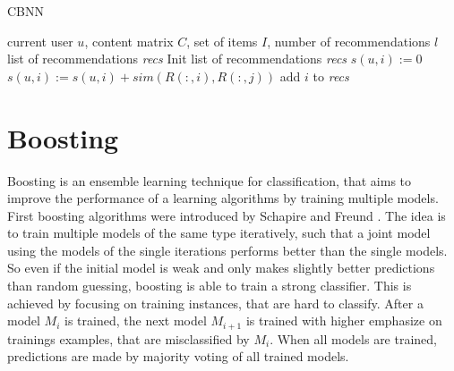\documentclass[10pt]{reportMaster}
\begin{document}
\begin{algorithm}
	\caption[CBNN]{CBNN}
	\label{alg:CBNN}
	\begin{algorithmic}[1]
		\Require current user $u$, content matrix $C$, set of items $I$, number of recommendations $l$
		\Ensure list of recommendations \textit{recs}
		\State Init list of recommendations \textit{recs}
			\State $s(u,i) := 0$
				\State $s(u,i) := s(u,i) + sim(R(:,i), R(:,j))$
			\EndFor
				\State add $i$ to \textit{recs}
			\EndIf
		\EndFor
	\end{algorithmic}	
\end{algorithm}

 
%
%






\section{Boosting}
\label{sec:boosting}
Boosting is an ensemble learning technique for classification, that aims to improve the performance of a learning algorithms by training multiple models.
First boosting algorithms were introduced by Schapire \cite{boostingSchapire} and Freund \cite{boostingFreund}.
The idea is to train multiple models of the same type iteratively, such that a joint model using the models of the single iterations performs better than the single models.
So even if the initial model is weak and only makes slightly better predictions than random guessing, boosting is able to train a strong classifier.
This is achieved by focusing on training instances, that are hard to classify.
After a model $M_i$ is trained, the next model $M_{i+1}$ is trained with higher emphasize on trainings examples, that are misclassified by $M_i$. 
When all models are trained, predictions are made by majority voting of all trained models.
\end{document}
